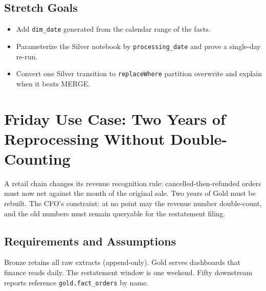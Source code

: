 \subsection*{Stretch Goals}
\begin{itemize}
    \item Add \texttt{dim\_date} generated from the calendar range of the facts.
    \item Parameterize the Silver notebook by \texttt{processing\_date} and prove a single-day re-run.
    \item Convert one Silver transition to \texttt{replaceWhere} partition overwrite and explain when it beats MERGE.
\end{itemize}

\section{Friday Use Case: Two Years of Reprocessing Without Double-Counting}
A retail chain changes its revenue recognition rule: cancelled-then-refunded orders must now net against the month of the original sale. Two years of Gold must be rebuilt. The CFO's constraint: at no point may the revenue number double-count, and the old numbers must remain queryable for the restatement filing.

\subsection{Requirements and Assumptions}
Bronze retains all raw extracts (append-only). Gold serves dashboards that finance reads daily. The restatement window is one weekend. Fifty downstream reports reference \texttt{gold.fact\_orders} by name.

